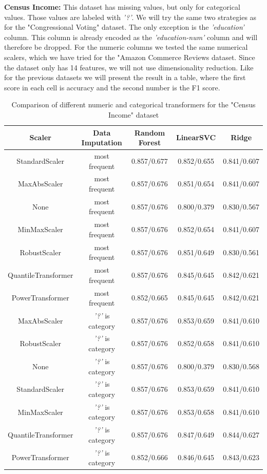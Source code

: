 \documentclass[a4paper,10pt]{article}
\begin{document}
\textbf{Census Income:} This dataset has missing values, but only for categorical values.
 Those values are labeled with \textit{'?'}. We will try the same two strategies as for the "Congressional Voting" dataset.
 The only exception is the \textit{'education'} column. This column is already encoded as the
 \textit{'education-num'} column and will therefore be dropped. For the numeric columns 
 we tested the same numerical scalers, which we have tried for the 
 "Amazon Commerce Reviews dataset. Since the dataset only has 14 features,
we will not use dimensionality reduction. Like for the previous
datasets we will present the result in a table, where the first score in each cell is accuracy and the second
number is the F1 score.

\begin{table}[h!]
\centering
\small
\begin{tabular}{|c|c|c|c|c|}
\hline
\textbf{Scaler} & \textsf{Data Imputation} & \textbf{Random Forest} & \textbf{LinearSVC} & \textbf{Ridge} \\
\hline
StandardScaler & most frequent & \cellcolor[HTML]{C1E1C1}0.857/0.677 & 0.852/0.655 & 0.841/0.607 \\
\hline
MaxAbsScaler & most frequent & 0.857/0.676 & 0.851/0.654 & 0.841/0.607 \\
\hline
None & most frequent & 0.857/0.676 & 0.800/0.379 & 0.830/0.567 \\
\hline
MinMaxScaler & most frequent & 0.857/0.676 & 0.852/0.654 & 0.841/0.607 \\
\hline
RobustScaler & most frequent & 0.857/0.676 & 0.851/0.649 & 0.830/0.561 \\
\hline
QuantileTransformer & most frequent & 0.857/0.676 & 0.845/0.645 & 0.842/0.621 \\
\hline
PowerTransformer & most frequent & 0.852/0.665 & 0.845/0.645 & 0.842/0.621 \\
\hline
MaxAbsScaler & \textit{'?'} is category & 0.857/0.676 & 0.853/0.659 & 0.841/0.610 \\
\hline
RobustScaler & \textit{'?'} is category & 0.857/0.676 & 0.852/0.658 & 0.841/0.610 \\
\hline
None & \textit{'?'} is category & 0.857/0.676 & 0.800/0.379 & 0.830/0.568 \\
\hline
StandardScaler & \textit{'?'} is category & 0.857/0.676 & \cellcolor[HTML]{C1E1C1}0.853/0.659 & 0.841/0.610 \\
\hline
MinMaxScaler & \textit{'?'} is category & 0.857/0.676 & 0.853/0.658 & 0.841/0.610 \\
\hline
QuantileTransformer & \textit{'?'} is category & 0.857/0.676 & 0.847/0.649 & \cellcolor[HTML]{C1E1C1}0.844/0.627 \\
\hline
PowerTransformer & \textit{'?'} is category & 0.852/0.666 & 0.846/0.645 & 0.843/0.623 \\
\hline
\end{tabular}
\caption{Comparison of different numeric and categorical transformers for the "Census Income" dataset}
\label{table:censustransformers}
\end{table}
\end{document}
